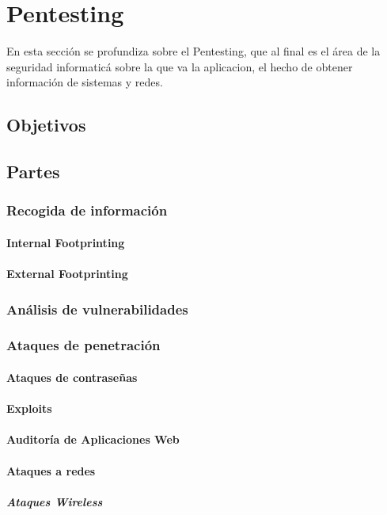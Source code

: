\chapter{Pentesting}

{\color{red} En esta sección se profundiza sobre el Pentesting, que al final es el área de la seguridad informaticá sobre la que va la aplicacion, el hecho de obtener información de sistemas y redes.}

\section{Objetivos}


\section{Partes}

\subsection{Recogida de información}

\subsubsection{Internal Footprinting}

\subsubsection{External Footprinting}

\subsection{Análisis de vulnerabilidades}

\subsection{Ataques de penetración}

\subsubsection{Ataques de contraseñas}

\subsubsection{Exploits}

\subsubsection{Auditoría de Aplicaciones Web}

\subsubsection{Ataques a redes}

\paragraph{Ataques Wireless}